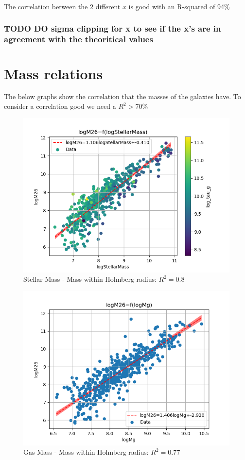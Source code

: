 \documentclass[a4paper]{article}
\begin{document}
The correlation between the 2 different \(x\) is good with an R-squared of 94\%

\subsubsection{{\bfseries\sffamily TODO} DO sigma clipping for x to see if the x's are in agreement with the theoritical values}
\label{sec:org33fabf5}

\section{Mass relations}
\label{sec:orgcb5272f}

The below graphs show the correlation that the masses of the galaxies have. To consider a correlation good we need a \(R^2>70\%\)


\begin{figure}[htbp]
\centering
\includegraphics[width=.9\linewidth]{./graphs/logStellarMass-logM26.png}
\caption{\label{Stellar Mass - Mass within Holmberg radius}Stellar Mass - Mass within Holmberg radius: \(R^2=0.8\)}
\end{figure}


\begin{figure}[htbp]
\centering
\includegraphics[width=.9\linewidth]{./graphs/logMg-logM26.png}
\caption{\label{Gas Mass - Mass within Holmberg radius}Gas Mass - Mass within Holmberg radius: \(R^2=0.77\)}
\end{figure}
\end{document}
